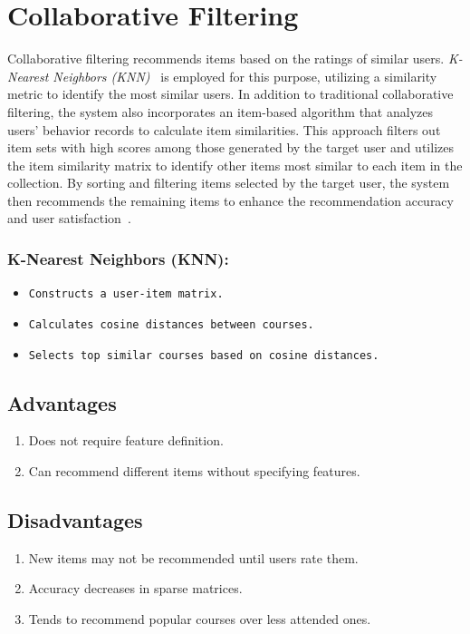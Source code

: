 \section{Collaborative Filtering}
Collaborative filtering recommends items based on the ratings of similar users. 
\textit{K-Nearest Neighbors (KNN)}~\cite{10.1007/978-3-030-66840-2_21,Shen2020} is employed for this 
purpose, utilizing a similarity metric to identify the most similar users. In addition to traditional 
collaborative filtering, the system also incorporates an item-based algorithm that analyzes users' behavior 
records to calculate item similarities. This approach filters out item sets with high scores among those 
generated by the target user and utilizes the item similarity matrix to identify other items most similar 
to each item in the collection. By sorting and filtering items selected by the target user, the system then 
recommends the remaining items to enhance the recommendation accuracy and user satisfaction~\cite{Thakkar2019}.

\subsubsection{K-Nearest Neighbors (KNN):} 

\begin{itemize}
  \item \texttt{Constructs a user-item matrix.}
  \item \texttt{Calculates cosine distances between courses.}
  \item \texttt{Selects top similar courses based on cosine distances.}
\end{itemize}
  
\subsection{Advantages}
\begin{enumerate}
  \item \textsf{Does not require feature definition.}
  \item \textsf{Can recommend different items without specifying features.}
\end{enumerate}

\subsection{Disadvantages}
\begin{enumerate}
  \item \textsf{New items may not be recommended until users rate them.}
  \item \textsf{Accuracy decreases in sparse matrices.}
  \item \textsf{Tends to recommend popular courses over less attended ones.}
\end{enumerate}

